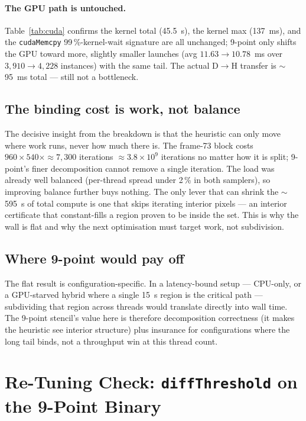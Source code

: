 \documentclass[
	english,
	letterpaper, oneside
]{article}
\begin{document}
\paragraph{The GPU path is untouched.} Table~\ref{tab:cuda} confirms the kernel
total (45.5~s), the kernel max (137~ms), and the \texttt{cudaMemcpy}
99\,\%-kernel-wait signature are all unchanged; 9-point only shifts the GPU
toward more, slightly smaller launches (avg $11.63\to10.78$~ms over
$3{,}910\to4{,}228$ instances) with the same tail. The actual
D$\rightarrow$H transfer is $\sim$95~ms total --- still not a bottleneck.

\subsection{The binding cost is work, not balance}

The decisive insight from the breakdown is that the heuristic can only move
where work runs, never how much there is. The frame-73 block
costs $960\times540 \times {\approx}7{,}300$ iterations $\approx 3.8\times10^9$
iterations no matter how it is split; 9-point's finer decomposition cannot
remove a single iteration. The load was already well balanced (per-thread
spread under 2\,\% in both samplers), so improving balance further buys nothing.
The only lever that can shrink the $\sim$595~s of total compute is one that
skips iterating interior pixels --- an interior certificate that
constant-fills a region proven to be inside the set. This is why the wall is
flat and why the next optimisation must target work, not subdivision.

\subsection{Where 9-point would pay off}

The flat result is configuration-specific. In a latency-bound setup --- CPU-only,
or a GPU-starved hybrid where a single 15~s region is the critical path
--- subdividing that region across threads would translate directly into wall
time. The 9-point stencil's value here is therefore decomposition correctness
(it makes the heuristic see interior structure) plus insurance for
configurations where the long tail binds, not a throughput win at this thread
count.

\section{Re-Tuning Check: \texttt{diffThreshold} on the 9-Point Binary}
\end{document}
